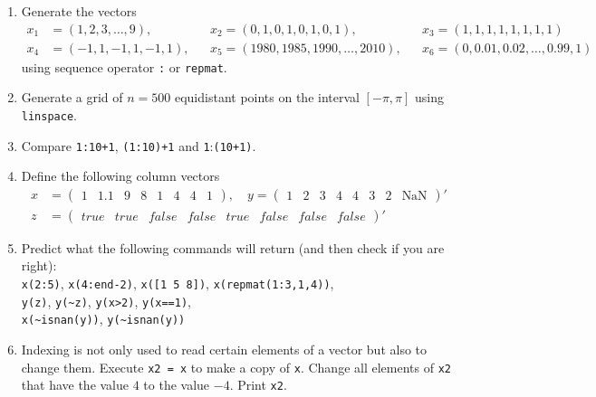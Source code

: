 \begin{enumerate}
\item
Generate the vectors
\begin{align*}
x_{1} &= \left(  1, 2,  3, \ldots,  9          \right) ,&&
x_{2}  = \left(  0, 1,  0,      1,  0, 1, 0, 1 \right) ,&&
x_{3}  = \left(  1, 1,  1,      1,  1, 1, 1, 1 \right) \\
x_{4} &= \left( -1, 1, -1,      1, -1, 1       \right) ,&&
x_{5}  = \left( 1980, 1985, 1990, \ldots, 2010 \right) ,&&
x_{6}  = \left( 0, 0.01, 0.02, \ldots, 0.99, 1 \right)
\end{align*}
using sequence operator \texttt{:} or \texttt{repmat}.

\item
Generate a grid of \(n=500\) equidistant points on the interval \([-\pi,\pi]\) using \texttt{linspace}.

\item
Compare \texttt{1:10+1}, \texttt{(1:10)+1} and {\texttt{1}:\texttt{(10+1)}}.

\item
Define the following column vectors
\begin{align*}
x &= \begin{pmatrix} 1 & 1.1 & 9 & 8 & 1 & 4 & 4 & 1 \end{pmatrix}
,\quad
y = \begin{pmatrix} 1 & 2 & 3 & 4 & 4 & 3 & 2 & \text{NaN} \end{pmatrix}'
\\
z &= \begin{pmatrix} true & true & false & false & true & false & false & false	\end{pmatrix}'
\end{align*}

\item
Predict what the following commands will return (and then check if you are right):
\\
\texttt{x{(2:5)}}, \texttt{x{(4:end-2)}}, \texttt{x{([1 5 8])}}, \texttt{x{(repmat{(1:3,1,4)})}},
\\
\texttt{y{(z)}}, \texttt{y{(\textasciitilde{z})}}, \texttt{y{(x>2)}}, \texttt{y{(x==1)}},
\\
\texttt{x{(\textasciitilde{isnan{(y)}})}}, \texttt{y{(\textasciitilde{isnan{(y)}})}}

\item
Indexing is not only used to read certain elements of a vector but also to change them.
Execute \texttt{x2 = x} to make a copy of \texttt{x}.
Change all elements of \texttt{x2} that have the value \(4\) to the value \(-4\).
Print \texttt{x2}.


\end{enumerate}
